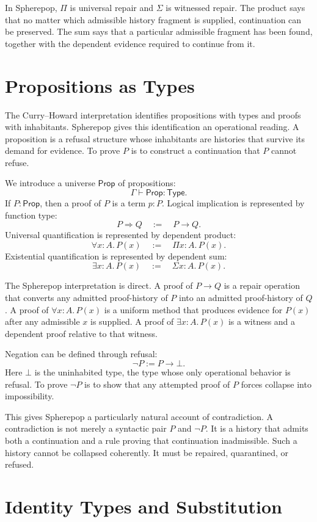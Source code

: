 \documentclass[12pt,oneside]{article}
\newcommand{\Type}{\mathsf{Type}}
\newcommand{\Prop}{\mathsf{Prop}}
\newcommand{\judges}{\vdash}
\begin{document}
In Spherepop, $\Pi$ is universal repair and $\Sigma$ is witnessed repair. The product says that no matter which admissible history fragment is supplied, continuation can be preserved. The sum says that a particular admissible fragment has been found, together with the dependent evidence required to continue from it.

\section{Propositions as Types}

The Curry--Howard interpretation identifies propositions with types and proofs with inhabitants. Spherepop gives this identification an operational reading. A proposition is a refusal structure whose inhabitants are histories that survive its demand for evidence. To prove $P$ is to construct a continuation that $P$ cannot refuse.

We introduce a universe $\Prop$ of propositions:
\[
\Gamma \judges \Prop : \Type.
\]
If $P:\Prop$, then a proof of $P$ is a term $p:P$. Logical implication is represented by function type:
\[
P \Rightarrow Q \quad := \quad P \to Q.
\]
Universal quantification is represented by dependent product:
\[
\forall x:A.\,P(x) \quad := \quad \Pi x:A.\,P(x).
\]
Existential quantification is represented by dependent sum:
\[
\exists x:A.\,P(x) \quad := \quad \Sigma x:A.\,P(x).
\]

The Spherepop interpretation is direct. A proof of $P \to Q$ is a repair operation that converts any admitted proof-history of $P$ into an admitted proof-history of $Q$. A proof of $\forall x:A.\,P(x)$ is a uniform method that produces evidence for $P(x)$ after any admissible $x$ is supplied. A proof of $\exists x:A.\,P(x)$ is a witness and a dependent proof relative to that witness.

Negation can be defined through refusal:
\[
\neg P := P \to \bot.
\]
Here $\bot$ is the uninhabited type, the type whose only operational behavior is refusal. To prove $\neg P$ is to show that any attempted proof of $P$ forces collapse into impossibility.

This gives Spherepop a particularly natural account of contradiction. A contradiction is not merely a syntactic pair $P$ and $\neg P$. It is a history that admits both a continuation and a rule proving that continuation inadmissible. Such a history cannot be collapsed coherently. It must be repaired, quarantined, or refused.

\section{Identity Types and Substitution}
\end{document}
